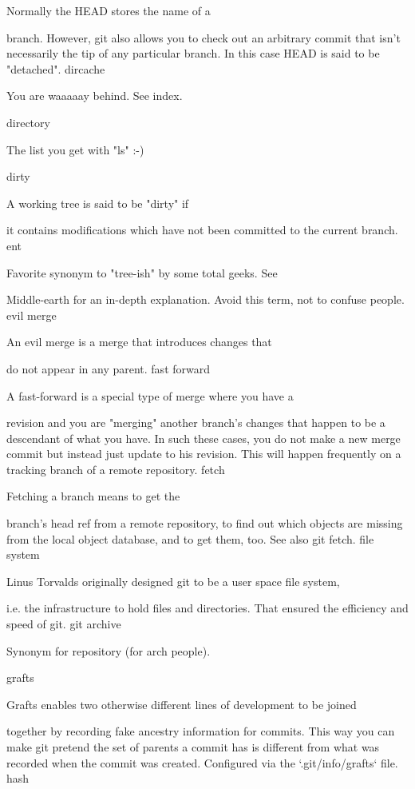 Normally the HEAD stores the name of a

branch.  However, git also allows you to check out
an arbitrary commit that isn't necessarily the tip of any
particular branch.  In this case HEAD is said to be "detached".
dircache

You are waaaaay behind. See index.

directory

The list you get with "ls" :-)

dirty

A working tree is said to be "dirty" if

it contains modifications which have not been committed to the current
branch.
ent

Favorite synonym to "tree-ish" by some total geeks. See

Middle-earth for an in-depth
explanation. Avoid this term, not to confuse people.
evil merge

An evil merge is a merge that introduces changes that

do not appear in any parent.
fast forward

A fast-forward is a special type of merge where you have a

revision and you are "merging" another
branch's changes that happen to be a descendant of what
you have. In such these cases, you do not make a new merge
commit but instead just update to his
revision. This will happen frequently on a
tracking branch of a remote
repository.
fetch

Fetching a branch means to get the

branch's head ref from a remote
repository, to find out which objects are
missing from the local object database,
and to get them, too.  See also git fetch.
file system

Linus Torvalds originally designed git to be a user space file system,

i.e. the infrastructure to hold files and directories. That ensured the
efficiency and speed of git.
git archive

Synonym for repository (for arch people).

grafts

Grafts enables two otherwise different lines of development to be joined

together by recording fake ancestry information for commits. This way
you can make git pretend the set of parents a commit has
is different from what was recorded when the commit was
created. Configured via the `.git/info/grafts` file.
hash

